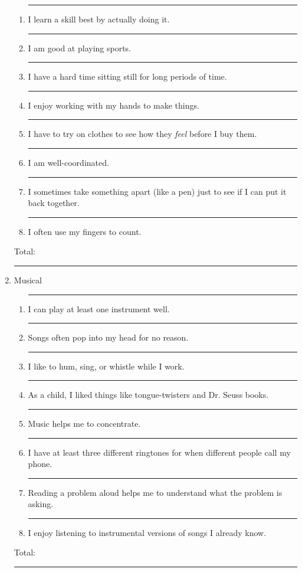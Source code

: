 \documentclass[letterpaper, 10pt]{article}
\begin{document}
\begin{enumerate}
\begin{enumerate}
	\item \rule{.5in}{.01in} I learn a skill best by actually doing it.
	\item \rule{.5in}{.01in} I am good at playing sports.
	\item \rule{.5in}{.01in} I have a hard time sitting still for long periods of time.
	\item \rule{.5in}{.01in} I enjoy working with my hands to make things.
	\item \rule{.5in}{.01in} I have to try on clothes to see how they \textit{feel} before I buy them.
	\item \rule{.5in}{.01in} I am well-coordinated.
	\item \rule{.5in}{.01in} I sometimes take something apart (like a pen) just to see if I can put it back together.
	\item \rule{.5in}{.01in} I often use my fingers to count.
\end{enumerate}
Total:  \rule{.5in}{.01in}

\vspace{.1in}

\item Musical
\begin{enumerate}
	\item \rule{.5in}{.01in} I can play at least one instrument well.
	\item \rule{.5in}{.01in} Songs often pop into my head for no reason.
	\item \rule{.5in}{.01in} I like to hum, sing, or whistle while I work.
	\item \rule{.5in}{.01in} As a child, I liked things like tongue-twisters and Dr. Seuss books.
	\item \rule{.5in}{.01in} Music helps me to concentrate.
	\item \rule{.5in}{.01in} I have at least three different ringtones for when different people call my phone.
	\item \rule{.5in}{.01in} Reading a problem aloud helps me to understand what the problem is asking.
	\item \rule{.5in}{.01in} I enjoy listening to instrumental versions of songs I already know.
\end{enumerate}
Total:  \rule{.5in}{.01in}

\vspace{.8in}


\end{enumerate}
\end{document}
